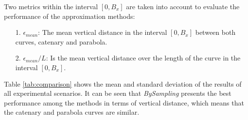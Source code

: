 Two metrics within the interval $[0,B_x]$ are taken into account to evaluate the performance of the approximation methods:
\begin{itemize}
        \item [1.] $\epsilon_{mean}$: The mean vertical distance in the interval $[0,B_x]$ between both curves, catenary and parabola.  
        \item [2.] $\epsilon_{mean}/L$:  Is the mean vertical distance over the length of the curve in the interval $[0,B_x]$.
\end{itemize} 




\noindent Table \ref{tab:comparison} shows the mean and standard deviation of the results of all experimental scenarios. It can be seen that \emph{BySampling} presents the best performance among the methods in terms of vertical distance, which means that the catenary and parabola curves are similar.

